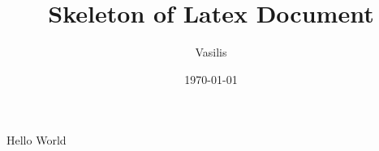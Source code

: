 \documentclass{article}
\title{Skeleton of Latex Document}
\author{Vasilis}
\date{\today}
\begin{document}
\maketitle

Hello World
\end{document}
